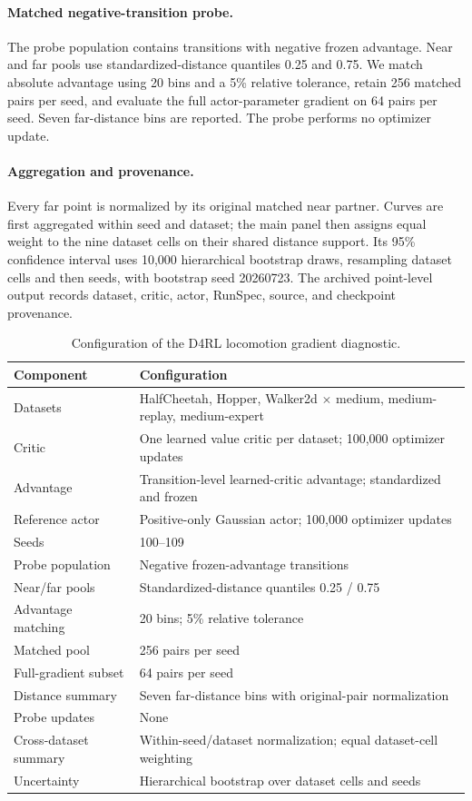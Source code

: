 \documentclass[sigconf,anonymous,review]{acmart}
\theoremstyle{acmdefinition}
\begin{document}
\paragraph{Matched negative-transition probe.}
The probe population contains transitions with negative frozen advantage.
Near and far pools use standardized-distance quantiles 0.25 and 0.75. We match
absolute advantage using 20 bins and a 5\% relative tolerance, retain 256
matched pairs per seed, and evaluate the full actor-parameter gradient on 64
pairs per seed. Seven far-distance bins are reported. The probe performs no
optimizer update.

\paragraph{Aggregation and provenance.}
Every far point is normalized by its original matched near partner. Curves are
first aggregated within seed and dataset; the main panel then assigns equal
weight to the nine dataset cells on their shared distance support. Its 95\%
confidence interval uses 10,000 hierarchical bootstrap draws, resampling
dataset cells and then seeds, with bootstrap seed 20260723. The archived
point-level output records dataset, critic, actor, RunSpec, source, and
checkpoint provenance.

\begin{table}[t]
\centering
\caption{Configuration of the D4RL locomotion gradient diagnostic.}
\label{tab:app_d4rl_gradient_protocol}
\small
\setlength{\tabcolsep}{5pt}
\begin{tabular}{ll}
\toprule
Component & Configuration \\
\midrule
Datasets & HalfCheetah, Hopper, Walker2d $\times$ medium, medium-replay, medium-expert \\
Critic & One learned value critic per dataset; 100,000 optimizer updates \\
Advantage & Transition-level learned-critic advantage; standardized and frozen \\
Reference actor & Positive-only Gaussian actor; 100,000 optimizer updates \\
Seeds & 100--109 \\
Probe population & Negative frozen-advantage transitions \\
Near/far pools & Standardized-distance quantiles 0.25 / 0.75 \\
Advantage matching & 20 bins; 5\% relative tolerance \\
Matched pool & 256 pairs per seed \\
Full-gradient subset & 64 pairs per seed \\
Distance summary & Seven far-distance bins with original-pair normalization \\
Probe updates & None \\
Cross-dataset summary & Within-seed/dataset normalization; equal dataset-cell weighting \\
Uncertainty & Hierarchical bootstrap over dataset cells and seeds \\
\bottomrule
\end{tabular}
\end{table}
\end{document}
